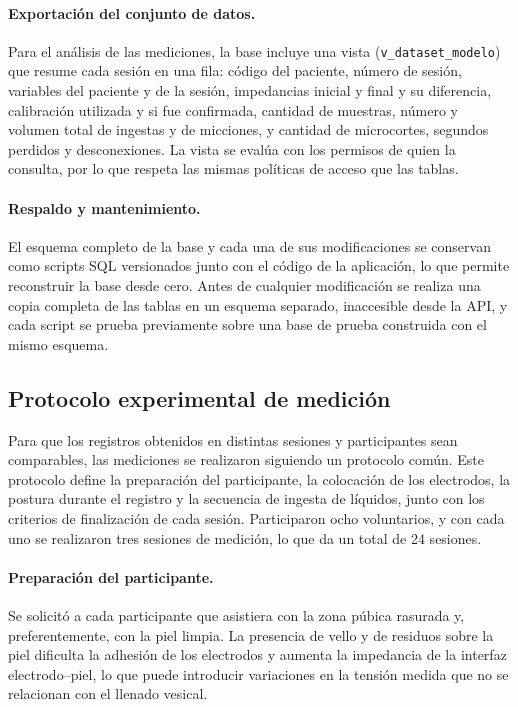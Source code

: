\documentclass[12pt,a4paper]{article}
\begin{document}
\paragraph{Exportación del conjunto de datos.} Para el análisis de las mediciones, la base incluye una vista (\texttt{v\_dataset\_modelo}) que resume cada sesión en una fila: código del paciente, número de sesión, variables del paciente y de la sesión, impedancias inicial y final y su diferencia, calibración utilizada y si fue confirmada, cantidad de muestras, número y volumen total de ingestas y de micciones, y cantidad de microcortes, segundos perdidos y desconexiones. La vista se evalúa con los permisos de quien la consulta, por lo que respeta las mismas políticas de acceso que las tablas.

\paragraph{Respaldo y mantenimiento.} El esquema completo de la base y cada una de sus modificaciones se conservan como scripts SQL versionados junto con el código de la aplicación, lo que permite reconstruir la base desde cero. Antes de cualquier modificación se realiza una copia completa de las tablas en un esquema separado, inaccesible desde la API, y cada script se prueba previamente sobre una base de prueba construida con el mismo esquema.

\subsection{Protocolo experimental de medición}
\label{sec:protocolo_medicion}

Para que los registros obtenidos en distintas sesiones y participantes sean comparables, las
mediciones se realizaron siguiendo un protocolo común. Este protocolo define la preparación del
participante, la colocación de los electrodos, la postura durante el registro y la secuencia de
ingesta de líquidos, junto con los criterios de finalización de cada sesión. Participaron
ocho voluntarios, y con cada uno se realizaron tres sesiones de medición, lo que da un total
de 24 sesiones.

\paragraph{Preparación del participante.}
Se solicitó a cada participante que asistiera con la zona púbica rasurada y, preferentemente,
con la piel limpia. La presencia de vello y de residuos sobre la piel dificulta la adhesión de los
electrodos y aumenta la impedancia de la interfaz electrodo--piel, lo que puede introducir
variaciones en la tensión medida que no se relacionan con el llenado vesical.
\end{document}
